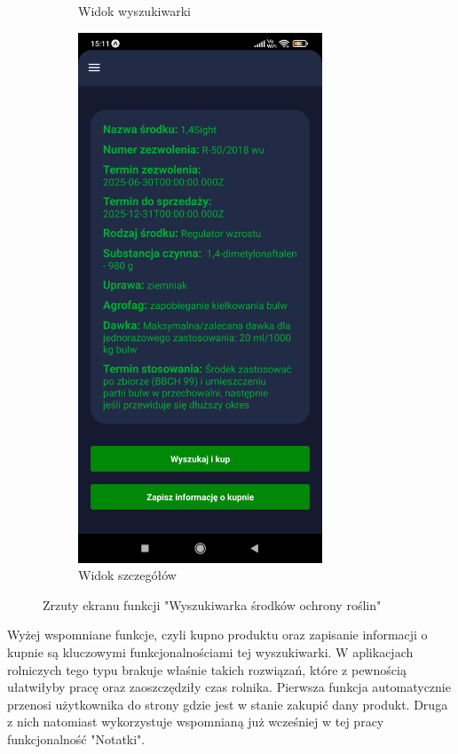 \documentclass[a4paper,12pt,oneside]{book}
\begin{document}
\begin{figure}[H]
\begin{subfigure}{.5\textwidth}
				\caption{Widok wyszukiwarki}
			\end{subfigure}%
			\begin{subfigure}{.5\textwidth}
				\centering
				\includegraphics[width=0.8\textwidth]{grafika/wysz_b.jpg}
				\caption{Widok szczegółów}
			\end{subfigure}
			\caption{Zrzuty ekranu funkcji "Wyszukiwarka środków ochrony roślin"}
		\end{figure}
	
		Wyżej wspomniane funkcje, czyli kupno produktu oraz zapisanie informacji o kupnie są kluczowymi funkcjonalnościami tej wyszukiwarki. W aplikacjach rolniczych tego typu brakuje właśnie takich rozwiązań, które z pewnością ułatwiłyby pracę oraz zaoszczędziły czas rolnika. Pierwsza funkcja automatycznie przenosi użytkownika do strony gdzie jest w stanie zakupić dany produkt. Druga z nich natomiast wykorzystuje wspomnianą już wcześniej w tej pracy funkcjonalność "Notatki". 
		
\end{document}
